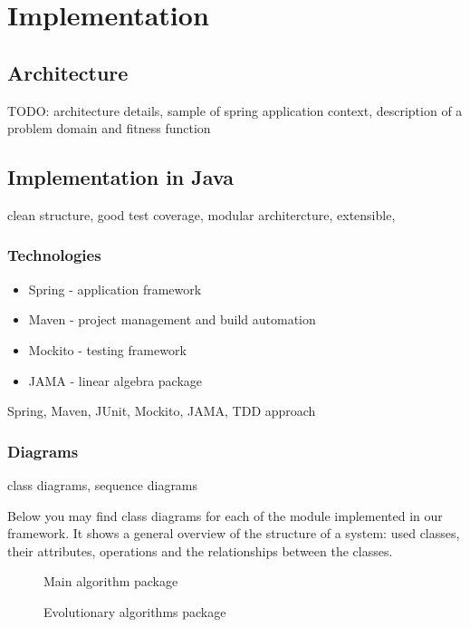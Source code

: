 

\chapter{Implementation}

\label{Implementation}

\section{Architecture}
TODO: architecture details, sample of spring application context,
description of a problem domain and fitness function

\section{Implementation in Java}
clean structure, good test coverage, 
modular architercture, extensible,

\subsection{Technologies}
\begin{itemize}
  \item Spring \cite{spring} - application framework
  \item Maven \cite{maven} - project management and build automation
  \item Mockito \cite{mockito} - testing framework 
  \item JAMA \cite{jama} - linear algebra package
\end{itemize}
Spring, Maven, JUnit, Mockito, JAMA, TDD approach

\subsection{Diagrams}
class diagrams, sequence diagrams

Below you may find class diagrams for each of the module implemented in our
framework. It shows a general overview of the structure of a system: used
classes, their attributes, operations and the relationships between the classes.


\begin{figure}
  \centering
  \caption{Main algorithm package}
  \label{alg}
\end{figure}

\begin{figure}
  \centering
  \caption{Evolutionary algorithms package}
  \label{ea}
\end{figure}


